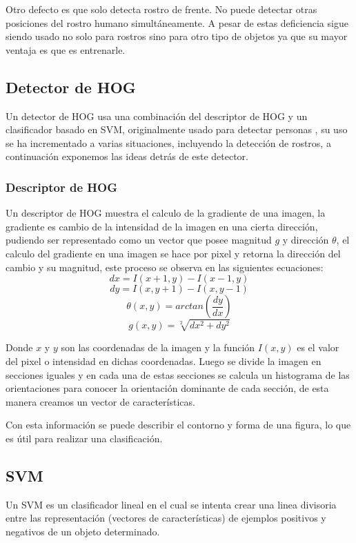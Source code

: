 Otro defecto es que solo detecta rostro de frente. No puede detectar otras posiciones del rostro humano simultáneamente. A pesar de estas deficiencia sigue siendo usado no solo para rostros sino para otro tipo de objetos ya que su mayor ventaja es que es entrenarle.

\subsection{Detector de \acf{HOG}}
Un detector de \acf{HOG} usa una combinación del descriptor de \ac{HOG} y un clasificador basado en \acf{SVM}, originalmente usado para detectar personas \cite{dalal2005histograms}, su uso se ha incrementado a varias situaciones, incluyendo la detección de rostros, a continuación exponemos las ideas detrás de este detector.
\subsubsection{Descriptor de \ac{HOG}}
Un descriptor de \ac{HOG} muestra el calculo de la gradiente de una imagen, la gradiente es cambio de la intensidad de la imagen en una cierta dirección, pudiendo ser representado como un vector que posee magnitud $g$ y dirección $\theta$, el calculo del gradiente en una imagen se hace por pixel y retorna la dirección del cambio y su magnitud, este proceso se observa en las siguientes ecuaciones:
\begin{equation}
dx=I(x+1,y)-I(x-1,y)
\end{equation}
\begin{equation}
dy=I(x,y+1)-I(x,y-1)
\end{equation}
\begin{equation}
\theta(x,y)=arctan\left(\frac{dy}{dx}\right)
\end{equation}
\begin{equation}
g(x,y)=\sqrt[2]{dx^2+dy^2}
\end{equation}

Donde $x$ y $y$ son las coordenadas de la imagen y la función $I(x,y)$ es el valor del pixel o intensidad en dichas coordenadas. Luego se divide la imagen en secciones iguales y en cada una de estas secciones se calcula un histograma de las orientaciones para conocer la orientación dominante de cada sección, de esta manera creamos un vector de características.

Con esta información se puede describir el contorno y forma de una figura, lo que es útil para realizar una clasificación.

\subsection{\acf{SVM}}
Un \ac{SVM} \cite{cortes1995support} es un clasificador lineal en el cual se intenta crear una linea divisoria entre las representación (vectores de características) de ejemplos positivos y negativos de un objeto determinado.

